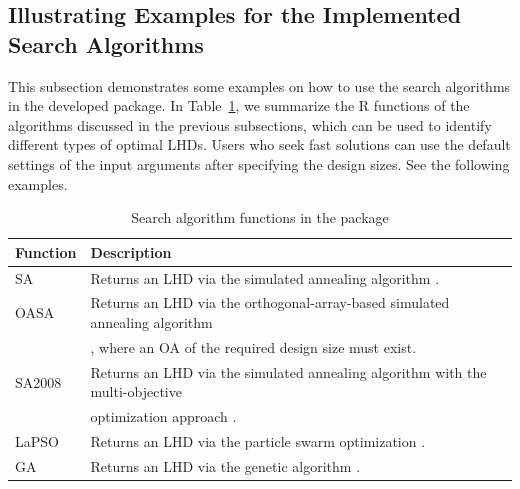 \subsection{Illustrating Examples for the Implemented Search Algorithms}

This subsection demonstrates some examples on how to use the search algorithms in the developed  package. In Table~\ref{A1}, we summarize the R functions of the algorithms discussed in the previous subsections, which can be used to identify different types of optimal LHDs. Users who seek fast solutions can use the default settings of the input arguments after specifying the design sizes. See the following examples.

\begin{table}[!htb]
	\caption{Search algorithm functions in the  package}\label{A1}
	\begin{center}
		\begin{tabular}{ll}
				\hline
				Function & Description\\
				\hline
				SA & Returns an LHD via the simulated annealing algorithm \citep{morris1995exploratory}.\\
				OASA & Returns an LHD via the orthogonal-array-based simulated annealing algorithm \\
				&  \citep{leary2003optimal}, where an OA of the required design size must exist.\\
				SA2008 & Returns an LHD via the simulated annealing algorithm with the multi-objective \\
				&  optimization approach  \citep{joseph2008orthogonal}.\\
				LaPSO & Returns an LHD via the particle swarm optimization  \citep{chen2013optimizing}.\\
				GA & Returns an LHD via the genetic algorithm  \citep{liefvendahl2006study}. \\
				\hline
		\end{tabular}
	\end{center}
\end{table}

